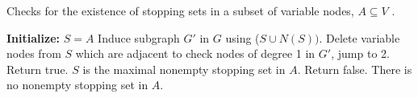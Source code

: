 \documentclass[10pt,twocolumn,twoside]{IEEEtran} \newlength{\pic}
\theoremstyle{definition}
\theoremstyle{remark}
\theoremstyle{plain}
\begin{document}
\begin{algorithm}[h]
\caption{Checks for the existence of stopping sets in a subset of variable nodes, $A\subseteq V$ \cite{Harrison10_ITW}.}
\begin{algorithmic}[1]
\STATE \textbf{Initialize:} $S = A$
    \STATE Induce subgraph $G'$ in $G$ using ($S \cup N(S))$.
      \STATE Delete variable nodes from $S$ which are adjacent to check nodes of degree 1 in $G'$, jump to 2.
    \ELSE
      \STATE Return true. $S$ is the maximal nonempty stopping set in $A$.
    \ENDIF
  \ELSE
    \STATE Return false. There is no nonempty stopping set in $A$.
  \ENDIF
\end{algorithmic}
\label{alg:isThereStoppingSet}
\end{algorithm}
\end{document}
